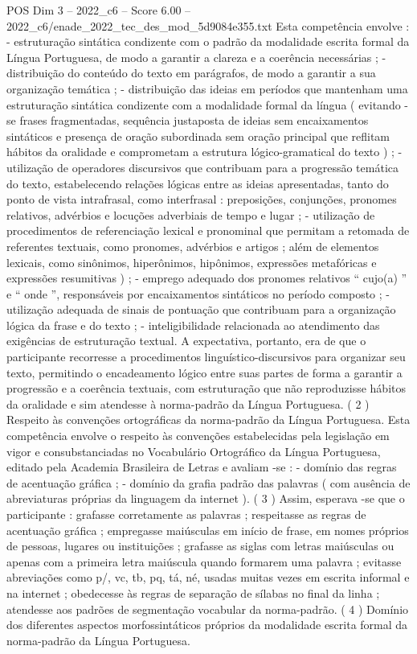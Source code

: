 \begin{textsample}{POS Dim 3 – 2022\_c6 – Score 6.00 – 2022\_c6/enade\_2022\_tec\_des\_mod\_5d9084e355.txt}
Esta competência envolve : - estruturação sintática condizente com o padrão da modalidade escrita formal da Língua Portuguesa, de modo a garantir a clareza e a coerência necessárias ; - distribuição do conteúdo do texto em parágrafos, de modo a garantir a sua organização temática ; - distribuição das ideias em períodos que mantenham uma estruturação sintática condizente com a modalidade formal da língua ( evitando -se frases fragmentadas, sequência justaposta de ideias sem encaixamentos sintáticos e presença de oração subordinada sem oração principal que reflitam hábitos da oralidade e comprometam a estrutura lógico-gramatical do texto ) ; - utilização de operadores discursivos que contribuam para a progressão temática do texto, estabelecendo relações lógicas entre as ideias apresentadas, tanto do ponto de vista intrafrasal, como interfrasal : preposições, conjunções, pronomes relativos, advérbios e locuções adverbiais de tempo e lugar ; - utilização de procedimentos de referenciação lexical e pronominal que permitam a retomada de referentes textuais, como pronomes, advérbios e artigos ; além de elementos lexicais, como sinônimos, hiperônimos, hipônimos, expressões metafóricas e expressões resumitivas ) ; - emprego adequado dos pronomes relativos “ cujo(a) ” e “ onde ”, responsáveis por encaixamentos sintáticos no período composto ; - utilização adequada de sinais de pontuação que contribuam para a organização lógica da frase e do texto ; - inteligibilidade relacionada ao atendimento das exigências de estruturação textual.
A expectativa, portanto, era de que o participante recorresse a procedimentos linguístico-discursivos para organizar seu texto, permitindo o encadeamento lógico entre suas partes de forma a garantir a progressão e a coerência textuais, com estruturação que não reproduzisse hábitos da oralidade e sim atendesse à norma-padrão da Língua Portuguesa. ( 2 ) Respeito às convenções ortográficas da norma-padrão da Língua Portuguesa.
Esta competência envolve o respeito às convenções estabelecidas pela legislação em vigor e consubstanciadas no Vocabulário Ortográfico da Língua Portuguesa, editado pela Academia Brasileira de Letras e avaliam -se : - domínio das regras de acentuação gráfica ; - domínio da grafia padrão das palavras ( com ausência de abreviaturas próprias da linguagem da internet ). ( 3 ) Assim, esperava -se que o participante : grafasse corretamente as palavras ; respeitasse as regras de acentuação gráfica ; empregasse maiúsculas em início de frase, em nomes próprios de pessoas, lugares ou instituições ; grafasse as siglas com letras maiúsculas ou apenas com a primeira letra maiúscula quando formarem uma palavra ; evitasse abreviações como p/, vc, tb, pq, tá, né, usadas muitas vezes em escrita informal e na internet ; obedecesse às regras de separação de sílabas no final da linha ; atendesse aos padrões de segmentação vocabular da norma-padrão. ( 4 ) Domínio dos diferentes aspectos morfossintáticos próprios da modalidade escrita formal da norma-padrão da Língua Portuguesa.

\end{textsample}
